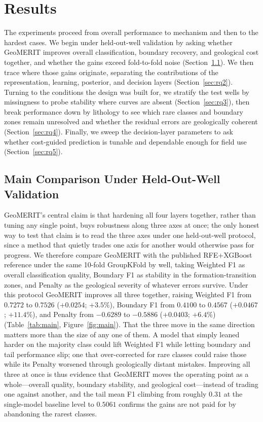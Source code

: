 \documentclass[bdcc,article,submit,pdftex,moreauthors]{Definitions/mdpi}
\begin{document}
\section{Results}
\label{sec:results}
The experiments proceed from overall performance to mechanism and then to the hardest cases.
We begin under held-out-well validation by asking whether GeoMERIT improves overall
classification, boundary recovery, and geological cost together, and whether the gains exceed
fold-to-fold noise (Section~\ref{sec:rq1}). We then trace where those gains originate,
separating the contributions of the representation, learning, posterior, and decision layers
(Section~\ref{sec:rq2}). Turning to the conditions the design was built for, we stratify the
test wells by missingness to probe stability where curves are absent (Section~\ref{sec:rq3}),
then break performance down by lithology to see which rare classes and boundary zones remain
unresolved and whether the residual errors are geologically coherent (Section~\ref{sec:rq4}).
Finally, we sweep the decision-layer parameters to ask whether cost-guided prediction is
tunable and dependable enough for field use (Section~\ref{sec:rq5}).

\subsection{Main Comparison Under Held-Out-Well Validation}
\label{sec:rq1}
GeoMERIT's central claim is that hardening all four layers together, rather than tuning any
single point, buys robustness along three axes at once; the only honest way to test that claim
is to read the three axes under one held-out-well protocol, since a method that quietly trades
one axis for another would otherwise pass for progress. We therefore compare GeoMERIT with the
published RFE+XGBoost reference under the same 10-fold GroupKFold by well, taking Weighted F1
as overall classification quality, Boundary F1 as stability in the formation-transition zones,
and Penalty as the geological severity of whatever errors survive. Under this protocol
GeoMERIT improves all three together, raising Weighted F1 from $0.7272$ to $0.7526$
($+0.0254$; $+3.5\%$), Boundary F1 from $0.4100$ to $0.4567$ ($+0.0467$; $+11.4\%$), and
Penalty from $-0.6289$ to $-0.5886$ ($+0.0403$; $+6.4\%$) (Table~\ref{tab:main},
Figure~\ref{fig:main}). That the three move in the same direction matters more than the size of
any one of them. A model that simply leaned harder on the majority class could lift Weighted F1
while letting boundary and tail performance slip; one that over-corrected for rare classes
could raise those while its Penalty worsened through geologically distant mistakes. Improving
all three at once is thus evidence that GeoMERIT moves the operating point as a whole---overall
quality, boundary stability, and geological cost---instead of trading one against another, and
the tail mean F1 climbing from roughly $0.31$ at the single-model baseline level to $0.5061$
confirms the gains are not paid for by abandoning the rarest classes.
\end{document}
